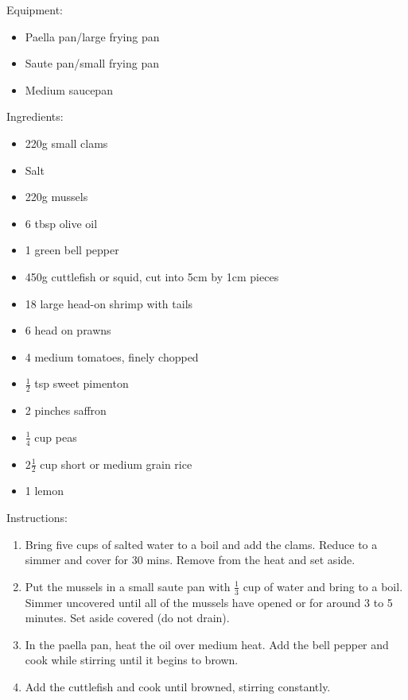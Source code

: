 \documentclass[a4paper, oneside]{book}
\begin{document}
\begin{multicols}{2}
    Equipment:

    {\begin{itemize}
        \item Paella pan/large frying pan
        \item Saute pan/small frying pan
        \item Medium saucepan
    \end{itemize}}
    Ingredients:
    {\begin{itemize}
        \item 220g small clams
        \item Salt
        \item 220g mussels
        \item 6 tbsp olive oil
        \item 1 green bell pepper
        \item 450g cuttlefish or squid, cut into 5cm by 1cm pieces
        \item 18 large head-on shrimp with tails
        \item 6 head on prawns
        \item 4 medium tomatoes, finely chopped
        \item \(\frac{1}{2}\) tsp sweet pimenton
        \item 2 pinches saffron
        \item \(\frac{1}{4}\) cup peas
        \item \(2\frac{1}{2}\) cup short or medium grain rice
        \item 1 lemon
    \end{itemize}}
    Instructions:
    {\begin{enumerate}
        \item 
            Bring five cups of salted water to a boil and add the clams. Reduce
            to a simmer and cover for 30 mins. Remove from the heat and set
            aside.
        \item
            Put the mussels in a small saute pan with \(\frac{1}{3}\) cup of
            water and bring to a boil. Simmer uncovered until all of the
            mussels have opened or for around 3 to 5 minutes. Set aside covered
            (do not drain).
        \item
            In the paella pan, heat the oil over medium heat. Add the bell
            pepper and cook while stirring until it begins to brown.
        \item
            Add the cuttlefish and cook until browned, stirring constantly.

\end{enumerate}}
\end{multicols}
\end{document}
